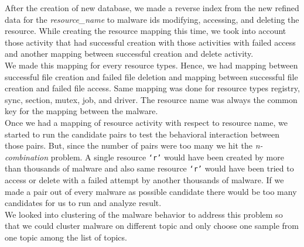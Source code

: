 After the creation of new database, we made a reverse index from the new refined data for the \emph{resource\_name} to malware ids modifying, accessing, and deleting the resource.
While creating the resource mapping this time, we took into account those activity that had successful creation with those activities with failed access and another mapping between successful creation and delete activity.\\
We made this mapping for every resource types. Hence, we had mapping between successful file creation and failed file deletion and mapping between successful file creation and failed file access.
Same mapping was done for resource types registry, sync, section, mutex, job, and driver. The resource name was always the common key for the mapping between the malware.\\
Once we had a mapping of resource activity with respect to resource name, we started to run the candidate pairs to test the behavioral interaction between those pairs. But, since the number of pairs were too many we hit the \emph{n-combination} problem.
A single resource \texttt{`r'} would have been created by more than thousands of malware and also same resource \texttt{`r'} would have been tried to access or delete with a failed attempt by another thousands of malware. If we made a pair out of every malware as possible candidate there would be too many candidates for us to run and analyze result.\\
We looked into clustering of the malware behavior to address this problem so that we could cluster malware on different topic and only choose one sample from one topic among the list of topics.
